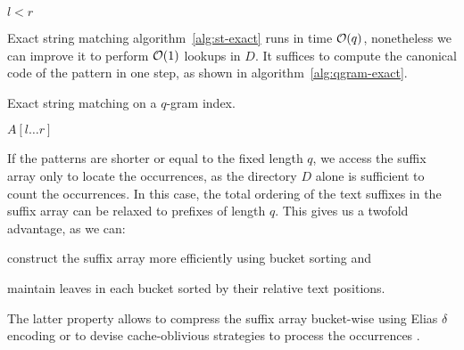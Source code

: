 \begin{algorithm}[h!]
\begin{minipage}[t]{.5\textwidth}
\label{alg:qgram-goroot}
\begin{algorithmic}[1]
\EndProcedure
\end{algorithmic}
\end{minipage}
\begin{minipage}[t]{.5\textwidth}
\label{alg:qgram-godownc}
\begin{algorithmic}[1]
		\State \Return \False
	\EndIf
	\State \Return $l < r$
\EndProcedure
\end{algorithmic}
\end{minipage}
\end{algorithm}

Exact string matching algorithm~\ref{alg:st-exact} runs in time $\mathcal{O}(q)$, nonetheless we can improve it to perform $\mathcal{O}(1)$ lookups in $D$.
It suffices to compute the canonical code of the pattern in one step, as shown in algorithm~\ref{alg:qgram-exact}.

\begin{algorithm}[h]
\caption{Exact string matching on a $q$-gram index.}
\label{alg:qgram-exact}
\begin{algorithmic}[1]
	\State \Report $A[l \dots r]$
\EndProcedure
\end{algorithmic}
\end{algorithm}

If the patterns are shorter or equal to the fixed length $q$, we access the suffix array only to locate the occurrences, as the directory $D$ alone is sufficient to count the occurrences.
In this case, the total ordering of the text suffixes in the suffix array can be relaxed to prefixes of length $q$.
This gives us a twofold advantage, as we can:
\begin{inparaenum}[(i)]
\item construct the suffix array more efficiently using bucket sorting and
\item maintain leaves in each bucket sorted by their relative text positions.
\end{inparaenum}
The latter property allows to compress the suffix array bucket-wise \eg using Elias $\delta$ encoding \citep{Elias1975} or to devise cache-oblivious strategies to process the occurrences \citep{Hach2010}.

